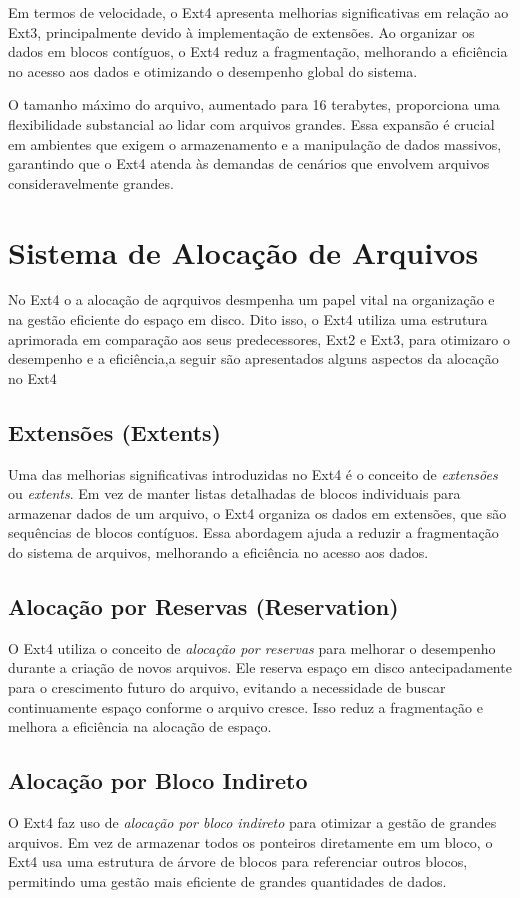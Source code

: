 \documentclass[
	12pt,				%
	openright,			%
	oneside,			%
	a4paper,			%
	chapter=TITLE,		%
	english,			%
	french,				%
	spanish,			%
	brazil				%
	]{abntex2}
\theoremstyle{definition}
\begin{document}
Em termos de velocidade, o Ext4 apresenta melhorias significativas em relação ao Ext3, principalmente devido 
à implementação de extensões. Ao organizar os dados em blocos contíguos, o Ext4 reduz a fragmentação, melhorando 
a eficiência no acesso aos dados e otimizando o desempenho global do sistema.

O tamanho máximo do arquivo, aumentado para 16 terabytes, proporciona uma flexibilidade substancial ao lidar 
com arquivos grandes. Essa expansão é crucial em ambientes que exigem o armazenamento e a manipulação de dados 
massivos, garantindo que o Ext4 atenda às demandas de cenários que envolvem arquivos consideravelmente grandes.


\chapter{Sistema de Alocação de Arquivos}
No Ext4 o a alocação de aqrquivos desmpenha um papel vital na organização e na gestão eficiente do espaço em disco. 
Dito isso, o Ext4 utiliza uma estrutura aprimorada em comparação aos seus predecessores, Ext2 e Ext3, para otimizaro 
o desempenho e a eficiência,a seguir são apresentados alguns aspectos da alocação no Ext4

\section{Extensões (Extents)}
Uma das melhorias significativas introduzidas no Ext4 é o conceito de \textit{extensões} ou \textit{extents}. Em vez de manter listas detalhadas de blocos individuais para armazenar dados de um arquivo, o Ext4 organiza os dados em extensões, que são sequências de blocos contíguos. Essa abordagem ajuda a reduzir a fragmentação do sistema de arquivos, melhorando a eficiência no acesso aos dados.

\section{Alocação por Reservas (Reservation)}
O Ext4 utiliza o conceito de \textit{alocação por reservas} para melhorar o desempenho durante a criação de novos arquivos. Ele reserva espaço em disco antecipadamente para o crescimento futuro do arquivo, evitando a necessidade de buscar continuamente espaço conforme o arquivo cresce. Isso reduz a fragmentação e melhora a eficiência na alocação de espaço.

\section{Alocação por Bloco Indireto}
O Ext4 faz uso de \textit{alocação por bloco indireto} para otimizar a gestão de grandes arquivos. Em vez de armazenar todos os ponteiros diretamente em um bloco, o Ext4 usa uma estrutura de árvore de blocos para referenciar outros blocos, permitindo uma gestão mais eficiente de grandes quantidades de dados.
\end{document}
